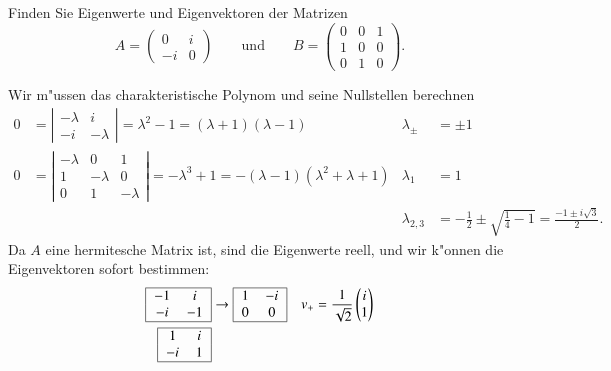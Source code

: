 Finden Sie Eigenwerte und Eigenvektoren der Matrizen
\[
A=\begin{pmatrix}
0&i\\
-i&0
\end{pmatrix}
\qquad\text{und}\qquad
B=\begin{pmatrix}
0&0&1\\
1&0&0\\
0&1&0
\end{pmatrix}.
\]

\begin{loesung}
Wir m"ussen das charakteristische Polynom und seine Nullstellen berechnen
\begin{align*}
0
&=
\left|\begin{matrix}
-\lambda&i\\
-i&-\lambda
\end{matrix}\right|
=\lambda^2-1
=(\lambda + 1)(\lambda - 1)
&
\lambda_\pm&=\pm 1
\\
0
&=
\left|\begin{matrix}
-\lambda&    0   &   1    \\
    1   &-\lambda&   0    \\
    0   &    1   &-\lambda
\end{matrix}\right|
=
-\lambda^3+1
=-(\lambda - 1)(\lambda^2+\lambda+1)
&
\lambda_1&=1\\
&&\lambda_{2,3}&=-\frac12\pm\sqrt{\frac14-1}=\frac{-1\pm i\sqrt{3}}2.
\end{align*}
Da $A$ eine hermitesche Matrix ist, sind die Eigenwerte reell, und
wir k"onnen die Eigenvektoren sofort bestimmen:
\begin{align*}
\begin{tabular}{|>{$}c<{$}>{$}c<{$}|}
\hline
-1&i\\
-i&-1\\
\hline
\end{tabular}
&\rightarrow
\begin{tabular}{|>{$}c<{$}>{$}c<{$}|}
\hline
 1&-i\\
 0& 0\\
\hline
\end{tabular}
&v_+&=\frac{1}{\sqrt{2}}\begin{pmatrix}i\\1\end{pmatrix}
\\
\begin{tabular}{|>{$}c<{$}>{$}c<{$}|}
\hline
 1&i\\
-i& 1\\
\hline
\end{tabular}

\end{align*}
\end{loesung}
